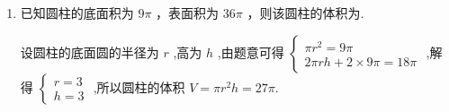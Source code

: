 \begin{enumerate}
\begin{jieda}
        所以该圆柱的体积为 $\pi {r}^{2}h = \pi  \times  9 \times  \dfrac{8}{3} = {24\pi }$ .
    \end{jieda}

    \item 已知圆柱的底面积为 ${9\pi }$ ，表面积为 ${36\pi }$ ，则该圆柱的体积为\blkda{$27\pi$}.
    \begin{jieda}  
        设圆柱的底面圆的半径为 $r$ ,高为 $h$ ,由题意可得 $\left\{  \begin{array}{l} \pi {r}^{2} = {9\pi } \\  {2\pi rh} + 2 \times 9\pi = {18\pi } \end{array}\right.$ ,解得 $\left\{  \begin{array}{l} r = 3 \\  h = 3 \end{array}\right.$ ,所以圆柱的体积 $V = \pi {r}^{2}h = {27\pi }$.
    \end{jieda}
\end{enumerate}
